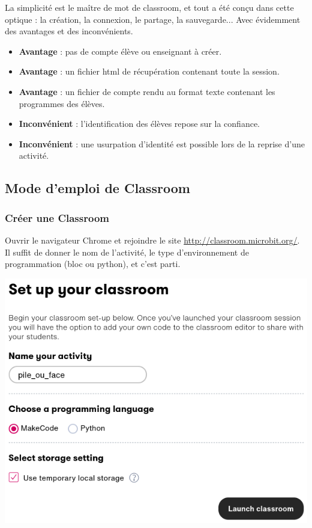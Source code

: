 \begin{remarque}
    La simplicité est le maître de mot de classroom, et tout a été conçu dans cette optique :
     la création, la connexion, le partage, la sauvegarde...
     Avec évidemment des avantages et des inconvénients.

    \begin{itemize}
        \item \textbf{Avantage} : pas de compte élève ou enseignant à créer.
        \item \textbf{Avantage} : un fichier html de récupération contenant toute la session.
        \item \textbf{Avantage} : un fichier de compte rendu au format texte contenant les programmes des élèves.
        \item \textbf{Inconvénient} : l'identification des élèves repose sur la confiance.
        \item \textbf{Inconvénient} : une usurpation d'identité est possible lors de la reprise d'une activité.
    \end{itemize}
\end{remarque}

\newpage
\subsection{Mode d'emploi de Classroom}

\subsubsection{Créer une Classroom}

\begin{methode}
    Ouvrir le navigateur Chrome et rejoindre le site \url{http://classroom.microbit.org/}.
    Il suffit de donner le nom de l'activité, le type d'environnement de programmation (bloc ou python),
     et c'est parti.
     \vspace{5mm}

    
    \centerline{\includegraphics[width=0.7\linewidth]{res/classroom_setup2.png}}~\\
\end{methode}

